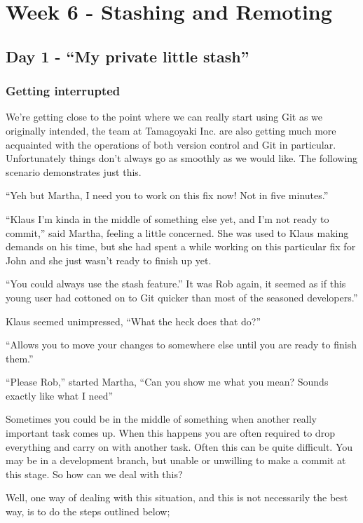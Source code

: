 \cleardoublepage
\chapter{Week 6 - Stashing and Remoting}
\section{Day 1 - ``My private little stash''}
\subsection{Getting interrupted}
We're getting close to the point where we can really start using Git as we originally intended, the team at Tamagoyaki Inc.
are also getting much more acquainted with the operations of both version control and Git in particular.
Unfortunately things don't always go as smoothly as we would like.
The following scenario demonstrates just this.

\begin{trenches}
``Yeh but Martha, I need you to work on this fix now! Not in five minutes.''

``Klaus I'm kinda in the middle of something else yet, and I'm not ready to commit,'' said Martha, feeling a little concerned.
She was used to Klaus making demands on his time, but she had spent a while working on this particular fix for John and she just wasn't ready to finish up yet.

``You could always use the stash feature.''
It was Rob again, it seemed as if this young user had cottoned on to Git quicker than most of the seasoned developers.''

Klaus seemed unimpressed, ``What the heck does that do?''

``Allows you to move your changes to somewhere else until you are ready to finish them.''

``Please Rob,'' started Martha,
``Can you show me what you mean? Sounds exactly like what I need''
\end{trenches}

Sometimes you could be in the middle of something when another really important task comes up.
When this happens you are often required to drop everything and carry on with another task.
Often this can be quite difficult.
You may be in a development branch, but unable or unwilling to make a commit at this stage.
So how can we deal with this?

Well, one way of dealing with this situation, and this is not necessarily the best way, is to do the steps outlined below;

